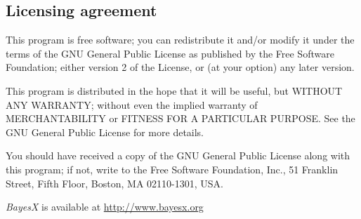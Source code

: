 {\subsection*{Licensing agreement}

This program is free software; you can redistribute it and/or
modify it under the terms of the GNU General Public License
as published by the Free Software Foundation; either version 2
of the License, or (at your option) any later version.

This program is distributed in the hope that it will be useful,
but WITHOUT ANY WARRANTY; without even the implied warranty of
MERCHANTABILITY or FITNESS FOR A PARTICULAR PURPOSE.  See the
GNU General Public License for more details.

You should have received a copy of the GNU General Public License
along with this program; if not, write to the Free Software
Foundation, Inc., 51 Franklin Street, Fifth Floor, Boston, MA  02110-1301, USA.



\vspace{0.5cm}

{\em BayesX} is available at { \href{http://www.bayesx.org}{http://www.bayesx.org}}}
